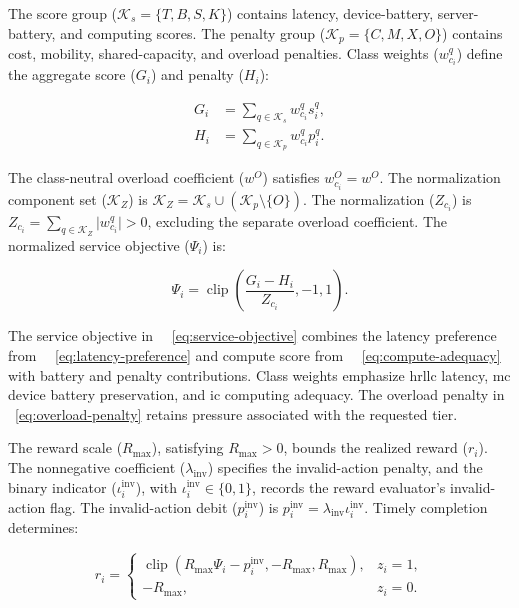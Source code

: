 \documentclass[journal]{IEEEtran}
\providecommand*{\algorithmautorefname}{Algorithm}
\providecommand*{\figureautorefname}{Figure}
\providecommand*{\subfigureautorefname}{Figure}
\providecommand*{\Autoref}[1]{%
  \begingroup
  \def\sectionautorefname{Section}%
  \def\subsectionautorefname{Subsection}%
  \def\subsubsectionautorefname{Subsubsection}%
  \def\algorithmautorefname{Algorithm}%
  \def\figureautorefname{Figure}%
  \def\subfigureautorefname{Figure}%
 ~\autoref{#1}%
  \endgroup
}
\newcommand{\Autoref}[1]{Eq.~\Autoref{#1}}
\begin{document}
The score group (\(\mathcal K_s=\{T,B,S,K\}\)) contains latency, device-battery, server-battery, and computing scores. The penalty group (\(\mathcal K_p=\{C,M,X,O\}\)) contains cost, mobility, shared-capacity, and overload penalties. Class weights (\(w_{c_i}^{q}\)) define the aggregate score (\(G_i\)) and penalty (\(H_i\)):

\[
\begin{aligned}
G_i
&=\sum_{q\in\mathcal K_s}w_{c_i}^{q}s_i^{q},\\
H_i
&=\sum_{q\in\mathcal K_p}w_{c_i}^{q}p_i^{q}.
\end{aligned}
\]

The class-neutral overload coefficient (\(w^{O}\)) satisfies \(w_{c_i}^{O}=w^{O}\). The normalization component set (\(\mathcal K_Z\)) is \(\mathcal K_Z=\mathcal K_s\cup(\mathcal K_p\setminus\{O\})\). The normalization (\(Z_{c_i}\)) is \(Z_{c_i}=\sum_{q\in\mathcal K_Z}\lvert w_{c_i}^{q}\rvert>0\), excluding the separate overload coefficient. The normalized service objective (\(\Psi_i\)) is:

\begin{equation}
\label{eq:service-objective}
\Psi_i
=
\operatorname{clip}
\left(
\frac{G_i-H_i}{Z_{c_i}},
-1,1
\right).
\end{equation}

The service objective in~\Autoref{eq:service-objective} combines the latency preference from~\Autoref{eq:latency-preference} and compute score from~\Autoref{eq:compute-adequacy} with battery and penalty contributions. Class weights emphasize \acs{hrllc} latency, \acs{mc} device battery preservation, and \acs{ic} computing adequacy. The overload penalty in~\Autoref{eq:overload-penalty} retains pressure associated with the requested tier.

The reward scale (\(R_{\max}\)), satisfying \(R_{\max}>0\), bounds the realized reward (\(r_i\)). The nonnegative coefficient (\(\lambda_{\mathrm{inv}}\)) specifies the invalid-action penalty, and the binary indicator (\(\iota_i^{\mathrm{inv}}\)), with \(\iota_i^{\mathrm{inv}}\in\{0,1\}\), records the reward evaluator’s invalid-action flag. The invalid-action debit (\(p_i^{\mathrm{inv}}\)) is \(p_i^{\mathrm{inv}}=\lambda_{\mathrm{inv}}\iota_i^{\mathrm{inv}}\). Timely completion determines:

\begin{equation}
\label{eq:realized-reward}
r_i=
\begin{cases}
\operatorname{clip}
\left(
R_{\max}\Psi_i-p_i^{\mathrm{inv}},
-R_{\max},R_{\max}
\right),
&z_i=1,\\
-R_{\max},
&z_i=0.
\end{cases}
\end{equation}
\end{document}
